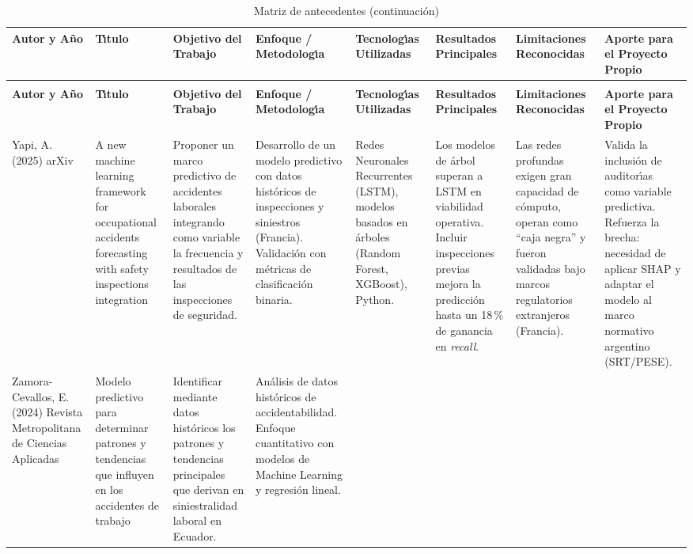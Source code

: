 \begin{landscape}
	\footnotesize
	\setlength{\tabcolsep}{3pt}
	\renewcommand{\arraystretch}{1.15}
	\begin{longtable}{@{}p{1.6cm}p{2.4cm}p{2.2cm}p{2.4cm}p{2cm}p{2.2cm}p{2.4cm}p{2.6cm}@{}}
		\caption{Matriz de antecedentes. \fuentepropia}\label{tab:matriz-antecedentes} \\
		\hline
		\textbf{Autor y A\~no} & \textbf{T\'{\i}tulo} & \textbf{Objetivo del Trabajo} & \textbf{Enfoque / Metodolog\'{\i}a} & \textbf{Tecnolog\'{\i}as Utilizadas} & \textbf{Resultados Principales} & \textbf{Limitaciones Reconocidas} & \textbf{Aporte para el Proyecto Propio} \\
		\hline
		\endfirsthead
		\caption[]{Matriz de antecedentes (continuaci\'on)} \\
		\hline
		\textbf{Autor y A\~no} & \textbf{T\'{\i}tulo} & \textbf{Objetivo del Trabajo} & \textbf{Enfoque / Metodolog\'{\i}a} & \textbf{Tecnolog\'{\i}as Utilizadas} & \textbf{Resultados Principales} & \textbf{Limitaciones Reconocidas} & \textbf{Aporte para el Proyecto Propio} \\
		\hline
		\endhead
		\hline
		\endfoot
		Yapi, A. (2025) arXiv &
		A new machine learning framework for occupational accidents forecasting with safety inspections integration &
		Proponer un marco predictivo de accidentes laborales integrando como variable la frecuencia y resultados de las inspecciones de seguridad. &
		Desarrollo de un modelo predictivo con datos hist\'oricos de inspecciones y siniestros (Francia). Validaci\'on con m\'etricas de clasificaci\'on binaria. &
		Redes Neuronales Recurrentes (LSTM), modelos basados en \'arboles (Random Forest, XGBoost), Python. &
		Los modelos de \'arbol superan a LSTM en viabilidad operativa. Incluir inspecciones previas mejora la predicci\'on hasta un 18\,\% de ganancia en \emph{recall}. &
		Las redes profundas exigen gran capacidad de c\'omputo, operan como ``caja negra'' y fueron validadas bajo marcos regulatorios extranjeros (Francia). &
		Valida la inclusi\'on de auditor\'{\i}as como variable predictiva. Refuerza la brecha: necesidad de aplicar SHAP y adaptar el modelo al marco normativo argentino (SRT/PESE). \\
		\hline
		Zamora-Cevallos, E. (2024) Revista Metropolitana de Ciencias Aplicadas &
		Modelo predictivo para determinar patrones y tendencias que influyen en los accidentes de trabajo &
		Identificar mediante datos hist\'oricos los patrones y tendencias principales que derivan en siniestralidad laboral en Ecuador. &
		An\'alisis de datos hist\'oricos de accidentabilidad. Enfoque cuantitativo con modelos de Machine Learning y regresi\'on lineal. &

\end{longtable}
\end{landscape}
